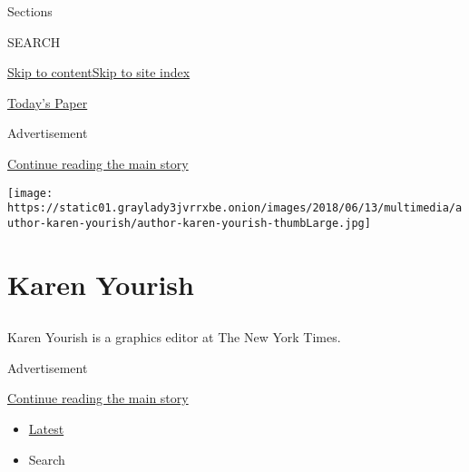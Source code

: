 Sections

SEARCH

\protect\hyperlink{site-content}{Skip to
content}\protect\hyperlink{site-index}{Skip to site index}

\href{https://myaccount.nytimes3xbfgragh.onion/auth/login?response_type=cookie\&client_id=vi}{}

\href{https://www.nytimes3xbfgragh.onion/section/todayspaper}{Today's
Paper}

Advertisement

\protect\hyperlink{after-top}{Continue reading the main story}

\texttt{[image: https://static01.graylady3jvrrxbe.onion/images/2018/06/13/multimedia/author-karen-yourish/author-karen-yourish-thumbLarge.jpg]}

\hypertarget{karen-yourish}{%
\section{Karen Yourish}\label{karen-yourish}}

\subsection{}

Karen Yourish is a graphics editor at The New York Times.

Advertisement

\protect\hyperlink{after-mid1}{Continue reading the main story}

\begin{itemize}
\tightlist
\item
  \protect\hyperlink{stream-panel}{Latest}
\item
  Search
\end{itemize}

